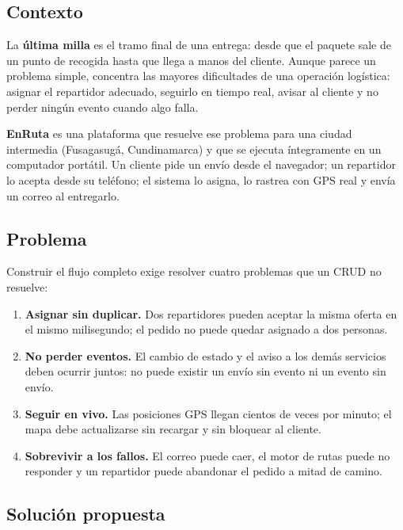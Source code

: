 \documentclass[conference]{IEEEtran}
\begin{document}
\subsection{Contexto}

La \textbf{última milla} es el tramo final de una entrega: desde que el paquete sale de un punto
de recogida hasta que llega a manos del cliente. Aunque parece un problema simple, concentra las
mayores dificultades de una operación logística: asignar el repartidor adecuado, seguirlo en
tiempo real, avisar al cliente y no perder ningún evento cuando algo falla.

\textbf{EnRuta} es una plataforma que resuelve ese problema para una ciudad intermedia
(Fusagasugá, Cundinamarca) y que se ejecuta íntegramente en un computador portátil. Un cliente
pide un envío desde el navegador; un repartidor lo acepta desde su teléfono; el sistema lo asigna,
lo rastrea con GPS real y envía un correo al entregarlo.

\subsection{Problema}

Construir el flujo completo exige resolver cuatro problemas que un CRUD no resuelve:

\begin{enumerate}[leftmargin=1.2cm]
  \item \textbf{Asignar sin duplicar.} Dos repartidores pueden aceptar la misma oferta en el
        mismo milisegundo; el pedido no puede quedar asignado a dos personas.
  \item \textbf{No perder eventos.} El cambio de estado y el aviso a los demás servicios deben
        ocurrir juntos: no puede existir un envío sin evento ni un evento sin envío.
  \item \textbf{Seguir en vivo.} Las posiciones GPS llegan cientos de veces por minuto; el mapa
        debe actualizarse sin recargar y sin bloquear al cliente.
  \item \textbf{Sobrevivir a los fallos.} El correo puede caer, el motor de rutas puede no
        responder y un repartidor puede abandonar el pedido a mitad de camino.
\end{enumerate}

\subsection{Solución propuesta}
\end{document}
